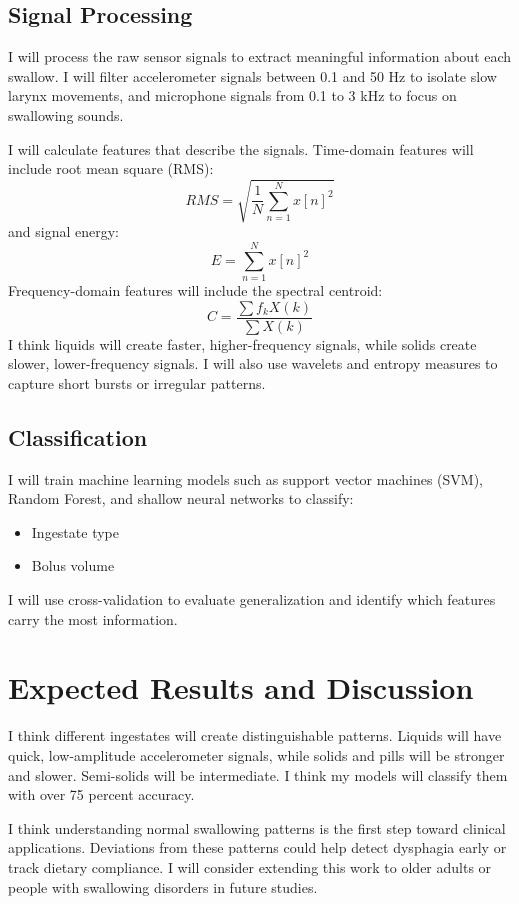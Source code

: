 \documentclass[conference]{IEEEtran}
\begin{document}
\subsection{Signal Processing}
I will process the raw sensor signals to extract meaningful information about each swallow. I will filter accelerometer signals between 0.1 and 50 Hz to isolate slow larynx movements, and microphone signals from 0.1 to 3 kHz to focus on swallowing sounds.

I will calculate features that describe the signals. Time-domain features will include root mean square (RMS):
\[
RMS = \sqrt{\frac{1}{N} \sum_{n=1}^{N} x[n]^2}
\]
and signal energy:
\[
E = \sum_{n=1}^{N} x[n]^2
\]
Frequency-domain features will include the spectral centroid:
\[
C = \frac{\sum f_k X(k)}{\sum X(k)}
\]
I think liquids will create faster, higher-frequency signals, while solids create slower, lower-frequency signals. I will also use wavelets and entropy measures to capture short bursts or irregular patterns.

\subsection{Classification}
I will train machine learning models such as support vector machines (SVM), Random Forest, and shallow neural networks to classify:
\begin{itemize}
    \item Ingestate type
    \item Bolus volume
\end{itemize}
I will use cross-validation to evaluate generalization and identify which features carry the most information.

\section{Expected Results and Discussion}
I think different ingestates will create distinguishable patterns. Liquids will have quick, low-amplitude accelerometer signals, while solids and pills will be stronger and slower. Semi-solids will be intermediate. I think my models will classify them with over 75 percent accuracy.

I think understanding normal swallowing patterns is the first step toward clinical applications. Deviations from these patterns could help detect dysphagia early or track dietary compliance. I will consider extending this work to older adults or people with swallowing disorders in future studies.
\end{document}
